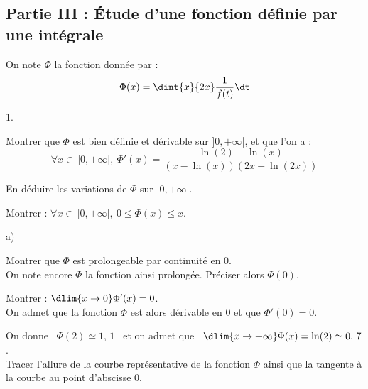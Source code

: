 \subsection*{Partie III : Étude d'une fonction définie par une 
intégrale}

\noindent
On note $\Phi$ la fonction donnée par :
\[
  \Phi(x) = \dint{x}{2x} \dfrac{1}{f(t)} \dt
\]

\begin{noliste}{1.}
  \setlength{\itemsep}{4mm}
  \setcounter{enumi}{7}
  \item Montrer que $\Phi$ est bien définie et dérivable sur 
  $]0,+\infty[$, et que l'on a :
  \[
    \forall x \in \ ]0,+\infty[, \ \Phi'(x) = \dfrac{\ln(2) - \ln(x)}
    {(x-\ln(x))(2x-\ln(2x))}
  \]
  
  
  
  
  
  
  \item En déduire les variations de $\Phi$ sur $]0,+\infty[$.
  
  

  
  \item Montrer : $\forall x \in \ ]0,+\infty[, \ 0 \leq \Phi(x) \leq 
  x$.
  
  
  
  \item 
  \begin{noliste}{a)}
    \setlength{\itemsep}{2mm}
    \item Montrer que $\Phi$ est prolongeable par continuité en $0$.\\
    On note encore $\Phi$ la fonction ainsi prolongée. Préciser alors 
    $\Phi(0)$.
    
    

    
  \item Montrer : $\dlim{x\to 0} \Phi'(x) =0$.\\
    On admet que la fonction $\Phi$ est alors dérivable en $0$ et que
    $\Phi'(0)=0$.
    
    
  \end{noliste}
  
  
  
  
  \item On donne \ $\Phi(2) \simeq 1, \, 1$ \ et on admet que \ 
  $\dlim{x\to +\infty} \Phi(x) = \ln(2) \simeq 0, \, 7$.\\
  Tracer l'allure de la courbe représentative de la fonction $\Phi$ 
  ainsi que la tangente à la courbe au point d'abscisse $0$.
  
  
\end{noliste}



